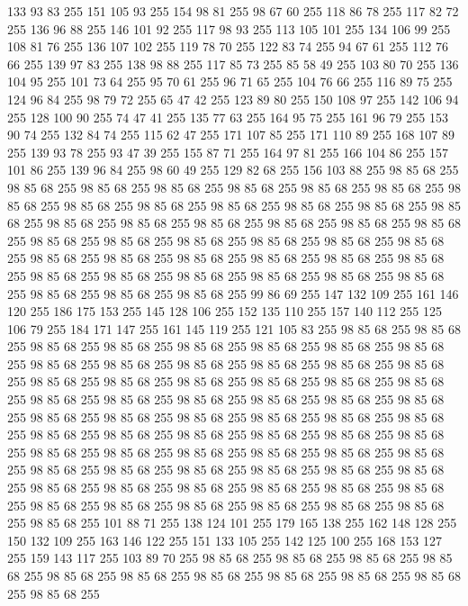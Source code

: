 133 93 83 255 151 105 93 255 154 98 81 255 98 67 60 255 118 86 78 255 117 82 72 255 136 96 88 255 146 101 92 255 117 98 93 255 113 105 101 255 134 106 99 255 108 81 76 255 136 107 102 255 119 78 70 255 122 83 74 255 94 67 61 255 112 76 66 255 139 97 83 255 138 98 88 255 117 85 73 255 85 58 49 255 103 80 70 255 136 104 95 255 101 73 64 255 95 70 61 255 96 71 65 255 104 76 66 255 116 89 75 255 124 96 84 255 98 79 72 255 65 47 42 255 123 89 80 255 150 108 97 255 142 106 94 255 128 100 90 255 74 47 41 255 135 77 63 255 164 95 75 255 161 96 79 255 153 90 74 255 132 84 74 255 115 62 47 255 171 107 85 255 171 110 89 255 168 107 89 255 139 93 78 255 93 47 39 255 155 87 71 255 164 97 81 255 166 104 86 255 157 101 86 255 139 96 84 255 98 60 49 255 129 82 68 255 156 103 88 255 98 85 68 255 98 85 68 255 98 85 68 255 98 85 68 255 98 85 68 255 98 85 68 255 98 85 68 255 98 85 68 255 98 85 68 255
98 85 68 255 98 85 68 255 98 85 68 255 98 85 68 255 98 85 68 255 98 85 68 255 98 85 68 255 98 85 68 255 98 85 68 255 98 85 68 255 98 85 68 255 98 85 68 255 98 85 68 255 98 85 68 255 98 85 68 255 98 85 68 255 98 85 68 255 98 85 68 255 98 85 68 255 98 85 68 255 98 85 68 255 98 85 68 255 98 85 68 255 98 85 68 255 98 85 68 255 98 85 68 255 98 85 68 255 98 85 68 255 98 85 68 255 98 85 68 255 98 85 68 255 98 85 68 255 99 86 69 255 147 132 109 255 161 146 120 255 186 175 153 255 145 128 106 255 152 135 110 255 157 140 112 255 125 106 79 255 184 171 147 255 161 145 119 255 121 105 83 255 98 85 68 255 98 85 68 255 98 85 68 255 98 85 68 255 98 85 68 255 98 85 68 255 98 85 68 255 98 85 68 255 98 85 68 255 98 85 68 255 98 85 68 255 98 85 68 255 98 85 68 255 98 85 68 255 98 85 68 255 98 85 68 255 98 85 68 255 98 85 68 255 98 85 68 255 98 85 68 255 98 85 68 255
98 85 68 255 98 85 68 255 98 85 68 255 98 85 68 255 98 85 68 255 98 85 68 255 98 85 68 255 98 85 68 255 98 85 68 255 98 85 68 255 98 85 68 255 98 85 68 255 98 85 68 255 98 85 68 255 98 85 68 255 98 85 68 255 98 85 68 255 98 85 68 255 98 85 68 255 98 85 68 255 98 85 68 255 98 85 68 255 98 85 68 255 98 85 68 255 98 85 68 255 98 85 68 255 98 85 68 255 98 85 68 255 98 85 68 255 98 85 68 255 98 85 68 255 98 85 68 255 98 85 68 255 98 85 68 255 98 85 68 255 98 85 68 255 98 85 68 255 98 85 68 255 98 85 68 255 98 85 68 255 98 85 68 255 98 85 68 255 101 88 71 255 138 124 101 255 179 165 138 255 162 148 128 255 150 132 109 255 163 146 122 255 151 133 105 255 142 125 100 255 168 153 127 255 159 143 117 255 103 89 70 255 98 85 68 255 98 85 68 255 98 85 68 255 98 85 68 255 98 85 68 255 98 85 68 255 98 85 68 255 98 85 68 255 98 85 68 255 98 85 68 255 98 85 68 255
